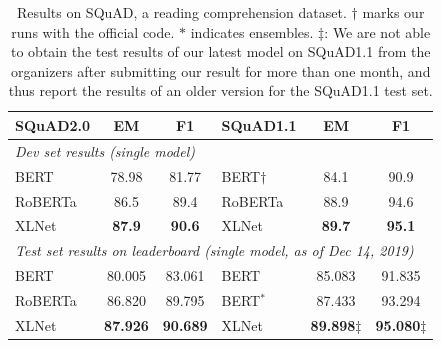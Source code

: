 \begin{table}[t!h]
  \small
  \centering
  
  \begin{tabular}{lcc|lcc}
    \toprule
    \bf SQuAD2.0 & \bf EM & \bf F1 & \bf SQuAD1.1 & \bf EM & \bf F1 \\
    \midrule
    \multicolumn{6}{l}{\it Dev set results (single model)} \\
    BERT \cite{devlin2018bert} & 78.98 & 81.77 & BERT$\dagger$ \cite{devlin2018bert} & 84.1 & 90.9 \\
    RoBERTa~\cite{liu2019roberta} & 86.5 & 89.4 & RoBERTa \cite{liu2019roberta}  & 88.9 & 94.6 \\
    XLNet & \bf 87.9 & \bf 90.6 & XLNet & \bf 89.7 & \bf 95.1 \\
    \midrule
    \multicolumn{6}{l}{\it Test set results on leaderboard (single model, as of Dec 14, 2019)} \\
    BERT~\cite{devlin2018bert} & 80.005 & 83.061 & BERT~\cite{devlin2018bert} & 85.083 & 91.835 \\
    RoBERTa~\cite{liu2019roberta} & 86.820 & 89.795 & BERT$^*$~\cite{devlin2018bert} & 87.433 & 93.294 \\
    XLNet & \bf 87.926 & \bf 90.689 & XLNet & \bf 89.898$\ddagger$ & \bf 95.080$\ddagger$ \\
    \bottomrule
  \end{tabular}
  \caption{\small
Results on SQuAD, a reading comprehension dataset.
    $\dagger$ marks our runs with the official code. $*$ indicates ensembles.
    $\ddagger$: We are not able to obtain the test results of our latest model on SQuAD1.1 from the organizers after submitting our result for more than one month, and thus report the results of an older version for the SQuAD1.1 test set.
  }
  \label{tab:sota-squad}
\end{table}

